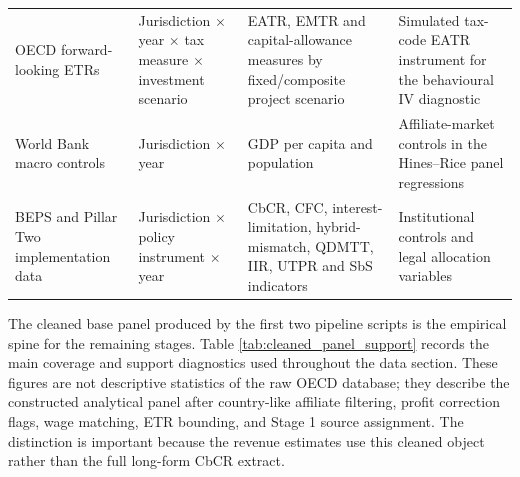 \documentclass[11pt,a4paper]{article}
\begin{document}
\begin{table}[H]
\begin{tabularx}{\textwidth}{@{}L{2.8cm}L{3.2cm}L{3.2cm}X@{}}
OECD forward-looking ETRs & Jurisdiction $\times$ year $\times$ tax measure $\times$ investment scenario & EATR, EMTR and capital-allowance measures by fixed/composite project scenario & Simulated tax-code EATR instrument for the behavioural IV diagnostic \\
World Bank macro controls & Jurisdiction $\times$ year & GDP per capita and population & Affiliate-market controls in the Hines--Rice panel regressions \\
BEPS and Pillar Two implementation data & Jurisdiction $\times$ policy instrument $\times$ year & CbCR, CFC, interest-limitation, hybrid-mismatch, QDMTT, IIR, UTPR and SbS indicators & Institutional controls and legal allocation variables \\
\bottomrule
\end{tabularx}
\end{table}

The cleaned base panel produced by the first two pipeline scripts is the empirical spine for the remaining stages. Table \ref{tab:cleaned_panel_support} records the main coverage and support diagnostics used throughout the data section. These figures are not descriptive statistics of the raw OECD database; they describe the constructed analytical panel after country-like affiliate filtering, profit correction flags, wage matching, ETR bounding, and Stage 1 source assignment. The distinction is important because the revenue estimates use this cleaned object rather than the full long-form CbCR extract.
\end{document}
